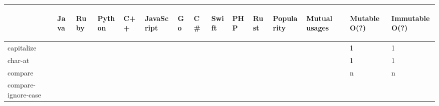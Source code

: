 \documentclass[anonymous,sigplan,review,11pt,nonacm,natbib=false]{acmart}
\begin{document}
    \begin{table*}
        \begin{tabular}{lllllllllllllll}
            \hline
            & \begin{sideways}Java\end{sideways}
            & \begin{sideways}Ruby\end{sideways}
            & \begin{sideways}Python\end{sideways}
            & \begin{sideways}C++\end{sideways}
            & \begin{sideways}JavaScript\end{sideways}
            & \begin{sideways}Go\end{sideways}
            & \begin{sideways}C\#\end{sideways}
            & \begin{sideways}Swift\end{sideways}
            & \begin{sideways}PHP\end{sideways}
            & \begin{sideways}Rust\end{sideways}
            & \begin{sideways}Popularity\end{sideways}
            & \begin{sideways}Mutual usages\end{sideways}
            & \begin{sideways}Mutable O(?)\end{sideways}
            & \begin{sideways}Immutable O(?)\end{sideways}
            \\ \hline

            capitalize &  &  &  &  &  &  &  &  &  &  &  &  & 1 & 1 \\

            char-at &  &  &  &  &  &  &  &  &  &  &  &  & 1 & 1 \\

            compare &  &  &  &  &  &  &  &  &  &  &  &  & n & n \\

            compare-ignore-case &  &  &  &  &  &  &  &  &  &  &  &  &  & \\


\end{tabular}
\end{table*}
\end{document}
